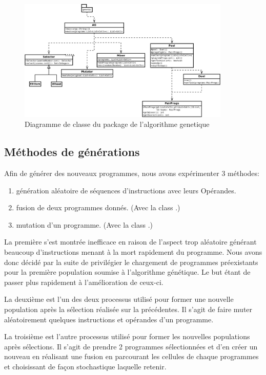 \documentclass[a4paper,12pt]{article} %
\begin{document}
\begin{figure}[!ht]
	\centering
	\includegraphics[width=0.9\textwidth]{images/diagram-algogen}
	\caption{Diagramme de classe du package de l'algorithme genetique}
\end{figure}


\subsection{Méthodes de générations}
Afin de générer des nouveaux programmes, nous avons expérimenter 3 méthodes:

\begin{enumerate}
	\item génération aléatoire de séquences d'instructions avec leurs Opérandes.
	\item fusion de deux programmes donnés. (Avec la class .)
	\item mutation d'un programme. (Avec la class .)
\end{enumerate}

La première s'est montrée inefficace en raison de l'aspect trop aléatoire générant beaucoup d'instructions menant à la mort rapidement du programme. Nous avons donc décidé par la suite de privilégier le chargement de programmes préexistants pour la première population soumise à l'algorithme génétique. Le but étant de passer plus rapidement à l'amélioration de ceux-ci.

La deuxième est l'un des deux processus utilisé pour former une nouvelle population après la sélection réalisée sur la précédentes. Il s'agit de faire muter aléatoirement quelques instructions et opérandes d'un programme.

La troisième est l'autre processus utilisé pour former les nouvelles populations après sélections. Il s'agit de prendre 2 programmes sélectionnées et d'en créer un nouveau en réalisant une fusion en parcourant les cellules de chaque programmes et choisissant de façon stochastique laquelle retenir.
\end{document}
